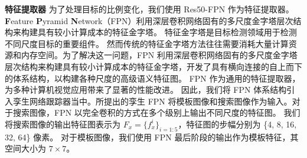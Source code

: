 \textbf{特征提取器} 为了处理目标的比例变化，我们使用 Res50-FPN \cite{lin2017feature} 作为特征提取器。
\textbf{F}eature \textbf{P}yramid \textbf{N}etwork（FPN）利用深层卷积网络固有的多尺度金字塔层次结构来构建具有较小计算成本的特征金字塔。
特征金字塔是目标检测领域用于检测不同尺度目标的重要组件。
然而传统的特征金字塔方法往往需要消耗大量计算资源和内存空间。为了解决这一问题，FPN 利用深层卷积网络固有的多尺度金字塔层次结构来构建具有较小计算成本的特征金字塔，开发了具有横向连接的自上而下的体系结构，以构建各种尺度的高级语义特征图。
FPN 作为通用的特征提取器，为多种计算机视觉应用带来了显著的性能改进。
因此，我们将 FPN 体系结构引入孪生网络跟踪器当中。所提出的孪生 FPN 将模板图像和搜索图像作为输入。对于搜索图像，FPN 以完全卷积的方式在多个级别上输出不同尺度的特征图。
我们将搜索图像的输出特征图表示为 $F_{x} = \{f_{x}^i\}_{i=1:5}$，特征图的步幅分别为 \{4, 8, 16, 32, 64\} 像素。
对于模板图像，我们使用 FPN 最后阶段的输出作为模板特征，其空间大小为 $7 \times 7$。

